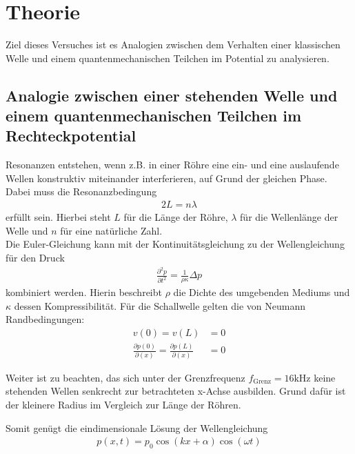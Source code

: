 \section{Theorie}
\label{sec:Theorie}

Ziel dieses Versuches ist es Analogien zwischen dem Verhalten einer klassischen Welle und einem quantenmechanischen Teilchen im Potential zu analysieren.

\subsection{Analogie zwischen einer stehenden Welle und einem quantenmechanischen Teilchen im Rechteckpotential}
\label{sec:Analogie zwischen einer stehenden Welle und einem quantenmechanischen Teilchen im Rechteckpotential}

Resonanzen entstehen, wenn z.B. in einer Röhre  eine ein- und eine auslaufende Wellen konstruktiv miteinander interferieren, auf Grund der gleichen Phase.
Dabei muss die Resonanzbedingung
\begin{align}
  2L=n\lambda
  \label{eq:RB}
\end{align}
erfüllt sein. Hierbei steht $L$ für die Länge der Röhre, $\lambda$ für die Wellenlänge der Welle und $n$ für eine natürliche Zahl.\\

Die Euler-Gleichung kann mit der Kontinuitätsgleichung zu der Wellengleichung für den Druck
\begin{align}
  \frac{\partial^2{p}}{{\partial{t^2}}} = \frac{1}{\rho \kappa} \Delta p
  \label{eq:klassWellengleichung}
\end{align}
kombiniert werden. Hierin beschreibt $\rho$ die Dichte des umgebenden Mediums und $\kappa$ dessen Kompressibilität. Für die Schallwelle gelten die von Neumann Randbedingungen:
\begin{align}
  v(0) = v(L) &= 0 \\
  \frac{\partial{p(0)}}{\partial(x)} = \frac{\partial{p(L)}}{\partial(x)} &=0
  \label{eq:Neumann}
\end{align}

Weiter ist zu beachten, das sich unter der Grenzfrequenz $f_\textrm{Grenz} = 16 \text{kHz}$ keine stehenden Wellen senkrecht zur betrachteten x-Achse ausbilden.
Grund dafür ist der kleinere Radius im Vergleich zur Länge der Röhren.

Somit genügt die eindimensionale Lösung der Wellengleichung
\begin{align}
  p(x,t) = p_0 \cos{(kx+\alpha)} \cos{(\omega t)}
  \label{eq:klasslsg}
\end{align}

